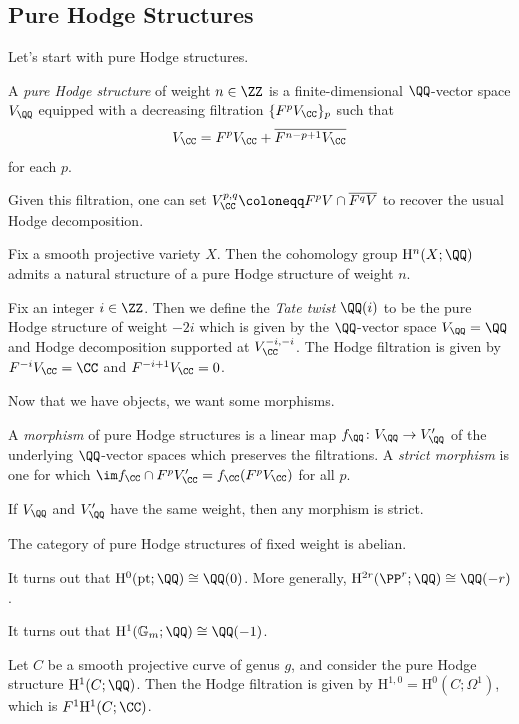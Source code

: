 \documentclass{article}
\begin{document}
\subsection{Pure Hodge Structures}
Let's start with pure Hodge structures.
\begin{definition}
	A \textit{pure Hodge structure} of weight $n\in\ZZ$ is a finite-dimensional $\QQ$-vector space $V_\QQ$ equipped with a decreasing filtration $\{F^pV_\CC\}_p$ such that
	\[V_\CC=F^pV_\CC+\overline{F^{n-p+1}V_\CC}\]
	for each $p$.
\end{definition}
\begin{remark}
	Given this filtration, one can set $V^{p,q}_\CC\coloneqq F^pV\cap\overline{F^qV}$ to recover the usual Hodge decomposition.
\end{remark}
\begin{example}
	Fix a smooth projective variety $X$. Then the cohomology group $\mathrm H^n(X;\QQ)$ admits a natural structure of a pure Hodge structure of weight $n$.
\end{example}
\begin{example}
	Fix an integer $i\in\ZZ$. Then we define the \textit{Tate twist} $\QQ(i)$ to be the pure Hodge structure of weight $-2i$ which is given by the $\QQ$-vector space $V_\QQ=\QQ$ and Hodge decomposition supported at $V^{-i,-i}_\CC$. The Hodge filtration is given by $F^{-i}V_\CC=\CC$ and $F^{-i+1}V_\CC=0$.
\end{example}
Now that we have objects, we want some morphisms.
\begin{definition}
	A \textit{morphism} of pure Hodge structures is a linear map $f_\QQ\colon V_\QQ\to V'_\QQ$ of the underlying $\QQ$-vector spaces which preserves the filtrations. A \textit{strict morphism} is one for which $\im f_\CC\cap F^pV'_\CC=f_\CC(F^pV_\CC)$ for all $p$.
\end{definition}
\begin{remark}
	If $V_\QQ$ and $V'_\QQ$ have the same weight, then any morphism is strict.
\end{remark}
\begin{remark}
	The category of pure Hodge structures of fixed weight is abelian.
\end{remark}
\begin{example}
	It turns out that $\mathrm H^0(\mathrm{pt};\QQ)\cong\QQ(0)$. More generally, $\mathrm H^{2r}(\PP^r;\QQ)\cong\QQ(-r)$.
\end{example}
\begin{example}
	It turns out that $\mathrm H^1(\mathbb G_m;\QQ)\cong\QQ(-1)$.
\end{example}
\begin{example}
	Let $C$ be a smooth projective curve of genus $g$, and consider the pure Hodge structure $\mathrm H^1(C;\QQ)$. Then the Hodge filtration is given by $\mathrm H^{1,0}=\mathrm H^0\left(C;\Omega^1\right)$, which is $F^1\mathrm H^1(C;\CC)$.
\end{example}
\end{document}
